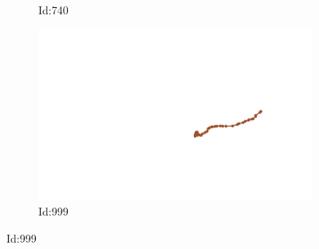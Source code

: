 \documentclass[12pt,twoside]{report}
\begin{document}
\begin{figure}
\begin{subfigure}[b]{0.20\textwidth}
\caption{Id:740}
\end{subfigure}
\begin{subfigure}[b]{0.20\textwidth}
\centering
\includegraphics[width=\textwidth]{../../trajectories/999.png}
\caption{Id:999}
\end{subfigure}
\end{figure}
\end{document}
